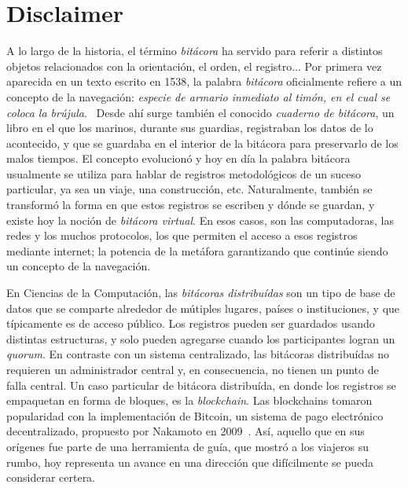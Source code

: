 \section{Disclaimer}


A lo largo de la historia, el término \textit{bitácora} ha servido para referir a
distintos objetos relacionados con la orientación, el orden, el registro... Por
primera vez aparecida en un texto escrito en 1538,
la palabra \textit{bitácora}
oficialmente refiere a un concepto de la navegación: \textit{especie de armario
inmediato al timón, en el cual se coloca la brújula}.~\cite{dic.Etimologico}
Desde ahí surge también
el conocido \textit{cuaderno de bitácora}, un libro en el que los marinos, durante
sus guardias, registraban los datos de lo acontecido, y que se guardaba en el
interior de la bitácora para preservarlo de los malos tiempos. El concepto
evolucionó y hoy en día la palabra bitácora usualmente se utiliza para hablar
de registros metodológicos de un suceso particular, ya sea un viaje, una
construcción, etc. Naturalmente, también se transformó la forma en que estos
registros se escriben y dónde se guardan, y existe hoy la noción de \textit{bitácora
virtual}. En esos casos, son las computadoras, las redes y los muchos protocolos,
los que permiten el acceso a esos registros mediante internet; la potencia de la
metáfora garantizando que continúe siendo un concepto de la navegación.
%

En Ciencias de la Computación, las \textit{bitácoras distribuídas} son un tipo de
base de datos que se comparte
alrededor de mútiples lugares, países o instituciones, y que típicamente es de
acceso público. Los registros pueden ser guardados usando distintas estructuras,
y solo pueden agregarse cuando los participantes logran un \textit{quorum}. En
contraste con un sistema centralizado, las bitácoras distribuídas no requieren
un administrador central y, en consecuencia, no tienen un punto de falla central.
Un caso particular de bitácora distribuída, en donde los registros se empaquetan
en forma de bloques, es la \textit{blockchain}. Las blockchains tomaron popularidad
con la implementación de Bitcoin, un sistema de pago electrónico decentralizado, 
propuesto por Nakamoto en 2009~\cite{nakamoto06bitcoin}.
Así, aquello que en sus orígenes fue parte de una herramienta de guía, que mostró
a los viajeros su rumbo, hoy representa un avance en una dirección que difícilmente se
pueda considerar certera.

